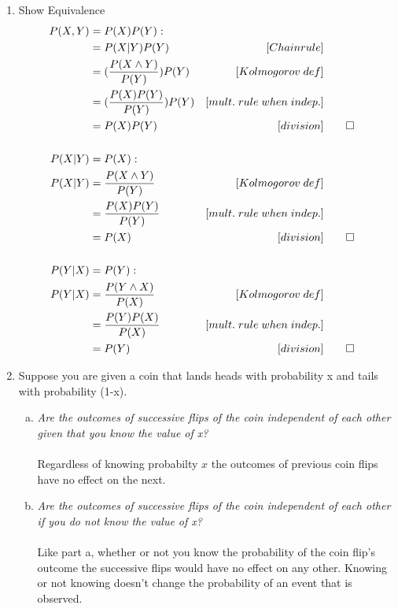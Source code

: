 \documentclass[10pt,draftclsnofoot,onecolumn]{IEEEtran}
\begin{document}
\begin{enumerate}
  \item Show Equivalence
  \begin{align*}
    P(X,Y) &= P(X)P(Y): \\
           &= P(X|Y)P(Y) & [Chain rule] \\
           &= (\frac{P(X \land Y)}{P(Y)})P (Y) & [Kolmogorov \; def] \\
           &= (\frac{P(X)P(Y)}{P(Y)})P(Y) & [mult. \; rule \; when \; indep.] \\
           &= P(X)P(Y)& [division] & \qed \\ \\
    P(X|Y) &= P(X): \\
    P(X|Y) &= \frac{P(X \land Y)}{P(Y)} & [Kolmogorov \; def] \\
           &= \frac{P(X)P(Y)}{P(Y)} & [mult. \; rule \; when \; indep.] \\
           &= P(X) & [division] & \qed \\ \\
    P(Y|X) &= P(Y): \\
    P(Y|X) &= \frac{P(Y \land X)}{P(X)} & [Kolmogorov \; def] \\
           &= \frac{P(Y)P(X)}{P(X)} & [mult. \; rule \; when \; indep.] \\
           &= P(Y) & [division] & \qed \\
  \end{align*}

  \newpage %

  \item Suppose you are given a coin that lands heads with probability x and tails with probability (1-x).
  \begin{enumerate}[a)]
    \item \textit{Are the outcomes of successive flips of the coin independent of each other given that you know the value of x?} \\ \\
    Regardless of knowing probabilty \( x \) the outcomes of previous coin flips have no effect on the next.

    \item \textit{Are the outcomes of successive flips of the coin independent of each other if you do not know the value of x?} \\ \\
    Like part a, whether or not you know the probability of the coin flip's outcome the successive flips would have no effect on any other.
    Knowing or not knowing doesn't change the probability of an event that is observed.  \\
  \end{enumerate}


\end{enumerate}
\end{document}
